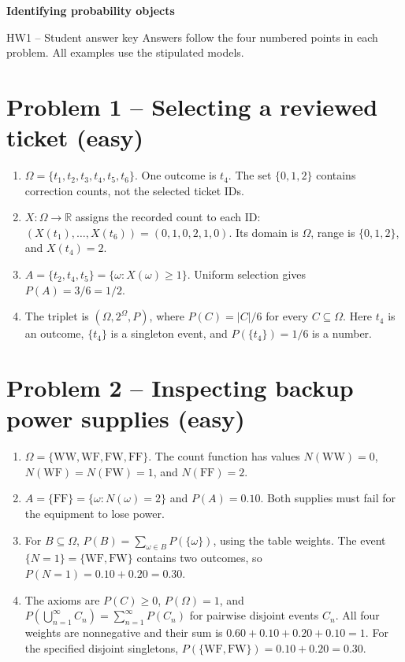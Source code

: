 \documentclass[11pt,a4paper]{article}
\begin{document}
{\Large\bfseries Identifying probability objects}
\par HW1 -- Student answer key
Answers follow the four numbered points in each problem. All examples use the stipulated models.
\section*{Problem 1 -- Selecting a reviewed ticket (easy)}
\begin{enumerate}
\item $\Omega=\{t_1,t_2,t_3,t_4,t_5,t_6\}$. One outcome is $t_4$. The set $\{0,1,2\}$ contains correction counts, not the selected ticket IDs.
\item $X:\Omega\to\mathbb R$ assigns the recorded count to each ID: $(X(t_1),\ldots,X(t_6))=(0,1,0,2,1,0)$. Its domain is $\Omega$, range is $\{0,1,2\}$, and $X(t_4)=2$.
\item $A=\{t_2,t_4,t_5\}=\{\omega:X(\omega)\ge1\}$. Uniform selection gives $P(A)=3/6=1/2$.
\item The triplet is $(\Omega,2^\Omega,P)$, where $P(C)=|C|/6$ for every $C\subseteq\Omega$. Here $t_4$ is an outcome, $\{t_4\}$ is a singleton event, and $P(\{t_4\})=1/6$ is a number.
\end{enumerate}
\section*{Problem 2 -- Inspecting backup power supplies (easy)}
\begin{enumerate}
\item $\Omega=\{\mathrm{WW},\mathrm{WF},\mathrm{FW},\mathrm{FF}\}$. The count function has values $N(\mathrm{WW})=0$, $N(\mathrm{WF})=N(\mathrm{FW})=1$, and $N(\mathrm{FF})=2$.
\item $A=\{\mathrm{FF}\}=\{\omega:N(\omega)=2\}$ and $P(A)=0.10$. Both supplies must fail for the equipment to lose power.
\item For $B\subseteq\Omega$, $P(B)=\sum_{\omega\in B}P(\{\omega\})$, using the table weights. The event $\{N=1\}=\{\mathrm{WF},\mathrm{FW}\}$ contains two outcomes, so $P(N=1)=0.10+0.20=0.30$.
\item The axioms are $P(C)\ge0$, $P(\Omega)=1$, and $P(\bigcup_{n=1}^{\infty}C_n)=\sum_{n=1}^{\infty}P(C_n)$ for pairwise disjoint events $C_n$. All four weights are nonnegative and their sum is $0.60+0.10+0.20+0.10=1$. For the specified disjoint singletons, $P(\{\mathrm{WF},\mathrm{FW}\})=0.10+0.20=0.30$.
\end{enumerate}
\clearpage
\end{document}
